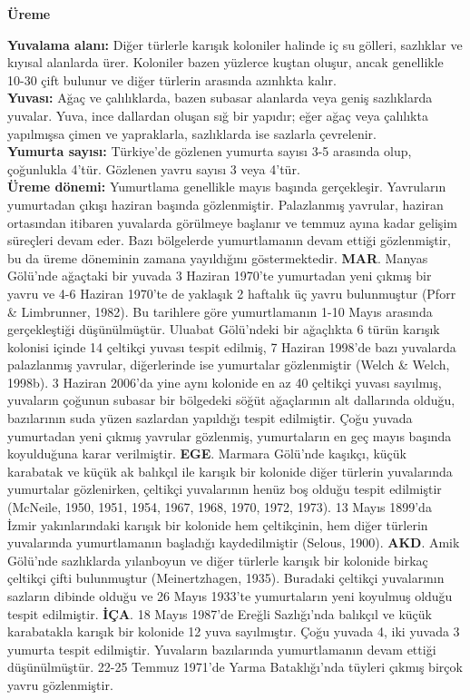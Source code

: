 \documentclass[
  a4paper,
  DIV=11,
  numbers=noendperiod]{scrreprt}
\begin{document}
\textbf{Üreme}

\textbf{Yuvalama alanı:} Diğer türlerle karışık koloniler halinde iç su
gölleri, sazlıklar ve kıyısal alanlarda ürer. Koloniler bazen yüzlerce
kuştan oluşur, ancak genellikle 10-30 çift bulunur ve diğer türlerin
arasında azınlıkta kalır.\\
\textbf{Yuvası:} Ağaç ve çalılıklarda, bazen subasar alanlarda veya
geniş sazlıklarda yuvalar. Yuva, ince dallardan oluşan sığ bir yapıdır;
eğer ağaç veya çalılıkta yapılmışsa çimen ve yapraklarla, sazlıklarda
ise sazlarla çevrelenir.\\
\textbf{Yumurta sayısı:} Türkiye'de gözlenen yumurta sayısı 3-5 arasında
olup, çoğunlukla 4'tür. Gözlenen yavru sayısı 3 veya 4'tür.\\
\textbf{Üreme dönemi:} Yumurtlama genellikle mayıs başında gerçekleşir.
Yavruların yumurtadan çıkışı haziran başında gözlenmiştir. Palazlanmış
yavrular, haziran ortasından itibaren yuvalarda görülmeye başlanır ve
temmuz ayına kadar gelişim süreçleri devam eder. Bazı bölgelerde
yumurtlamanın devam ettiği gözlenmiştir, bu da üreme döneminin zamana
yayıldığını göstermektedir. \textbf{MAR}. Manyas Gölü'nde ağaçtaki bir
yuvada 3 Haziran 1970'te yumurtadan yeni çıkmış bir yavru ve 4-6 Haziran
1970'te de yaklaşık 2 haftalık üç yavru bulunmuştur (Pforr \&
Limbrunner, 1982). Bu tarihlere göre yumurtlamanın 1-10 Mayıs arasında
gerçekleştiği düşünülmüştür. Uluabat Gölü'ndeki bir ağaçlıkta 6 türün
karışık kolonisi içinde 14 çeltikçi yuvası tespit edilmiş, 7 Haziran
1998'de bazı yuvalarda palazlanmış yavrular, diğerlerinde ise yumurtalar
gözlenmiştir (Welch \& Welch, 1998b). 3 Haziran 2006'da yine aynı
kolonide en az 40 çeltikçi yuvası sayılmış, yuvaların çoğunun subasar
bir bölgedeki söğüt ağaçlarının alt dallarında olduğu, bazılarının suda
yüzen sazlardan yapıldığı tespit edilmiştir. Çoğu yuvada yumurtadan yeni
çıkmış yavrular gözlenmiş, yumurtaların en geç mayıs başında koyulduğuna
karar verilmiştir. \textbf{EGE}. Marmara Gölü'nde kaşıkçı, küçük
karabatak ve küçük ak balıkçıl ile karışık bir kolonide diğer türlerin
yuvalarında yumurtalar gözlenirken, çeltikçi yuvalarının henüz boş
olduğu tespit edilmiştir (McNeile, 1950, 1951, 1954, 1967, 1968, 1970,
1972, 1973). 13 Mayıs 1899'da İzmir yakınlarındaki karışık bir kolonide
hem çeltikçinin, hem diğer türlerin yuvalarında yumurtlamanın başladığı
kaydedilmiştir (Selous, 1900). \textbf{AKD}. Amik Gölü'nde sazlıklarda
yılanboyun ve diğer türlerle karışık bir kolonide birkaç çeltikçi çifti
bulunmuştur (Meinertzhagen, 1935). Buradaki çeltikçi yuvalarının
sazların dibinde olduğu ve 26 Mayıs 1933'te yumurtaların yeni koyulmuş
olduğu tespit edilmiştir. \textbf{İÇA}. 18 Mayıs 1987'de Ereğli
Sazlığı'nda balıkçıl ve küçük karabatakla karışık bir kolonide 12 yuva
sayılmıştır. Çoğu yuvada 4, iki yuvada 3 yumurta tespit edilmiştir.
Yuvaların bazılarında yumurtlamanın devam ettiği düşünülmüştür. 22-25
Temmuz 1971'de Yarma Bataklığı'nda tüyleri çıkmış birçok yavru
gözlenmiştir.
\end{document}
